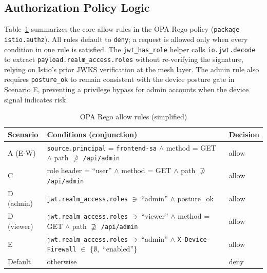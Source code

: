 \documentclass[conference]{IEEEtran}
\begin{document}
\subsection{Authorization Policy Logic}
Table~\ref{tab:rego} summarizes the core allow rules in the OPA Rego policy
(\texttt{package istio.authz}). All rules default to \texttt{deny}; a request
is allowed only when every condition in one rule is satisfied. The
\texttt{jwt\_has\_role} helper calls \texttt{io.jwt.decode} to extract
\texttt{payload.realm\_access.roles} without re-verifying the signature,
relying on Istio's prior JWKS verification at the mesh layer. The admin rule
also requires \texttt{posture\_ok} to remain consistent with the device posture
gate in Scenario E, preventing a privilege bypass for admin accounts when the
device signal indicates risk.

\begin{table}[!t]
\caption{OPA Rego allow rules (simplified)}
\label{tab:rego}
\centering
\scriptsize
\begin{tabularx}{\columnwidth}{l >{\raggedright\arraybackslash}X l}
\toprule
Scenario & Conditions (conjunction) & Decision \\
\midrule
A (E-W) & \texttt{source.principal} = \texttt{frontend-sa} $\wedge$ method = GET $\wedge$ path $\not\supseteq$ \texttt{/api/admin} & allow \\
C & role header = ``user'' $\wedge$ method = GET $\wedge$ path $\not\supseteq$ \texttt{/api/admin} & allow \\
D (admin) & \texttt{jwt.realm\_access.roles} $\ni$ ``admin'' $\wedge$ posture\_ok & allow \\
D (viewer) & \texttt{jwt.realm\_access.roles} $\ni$ ``viewer'' $\wedge$ method = GET $\wedge$ path $\not\supseteq$ \texttt{/api/admin} & allow \\
E & \texttt{jwt.realm\_access.roles} $\ni$ ``admin'' $\wedge$ \texttt{X-Device-Firewall} $\in$ \{$\emptyset$,\ ``enabled''\} & allow \\
Default & otherwise & deny \\
\bottomrule
\end{tabularx}
\end{table}
\end{document}
